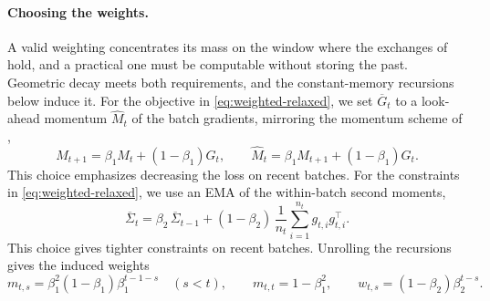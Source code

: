 \paragraph{Choosing the weights.}
A valid weighting concentrates its mass on the window where the
exchanges of  hold, and a practical one must be
computable without storing the past. Geometric decay meets both
requirements, and the constant-memory recursions below induce it. For
the objective in \eqref{eq:weighted-relaxed}, we set $\overline G_t$ to a
look-ahead momentum $\widehat M_t$ of the batch gradients, mirroring the
momentum scheme of ,
\[
  M_{t+1}=\beta_1M_t+(1-\beta_1)G_t,
  \qquad
  \widehat M_t=\beta_1M_{t+1}+(1-\beta_1)G_t.
\]
This choice emphasizes decreasing the loss on recent batches. For the
constraints in \eqref{eq:weighted-relaxed}, we use an EMA of the within-batch second
moments,
\[
  \overline\Sigma_t
  =\beta_2\,\overline\Sigma_{t-1}
  +(1-\beta_2)\,\frac1{n_t}\sum_{i=1}^{n_t}g_{t,i}g_{t,i}^\top.
\]
This choice gives tighter constraints on recent batches. Unrolling the
recursions gives the induced weights
\begin{equation}\label{eq:EMAweights}
  m_{t,s}=\beta_1^2(1-\beta_1)\beta_1^{t-1-s}
  \quad(s<t),
  \qquad
  m_{t,t}=1-\beta_1^2,
  \qquad
  w_{t,s}=(1-\beta_2)\beta_2^{t-s}.
\end{equation}

